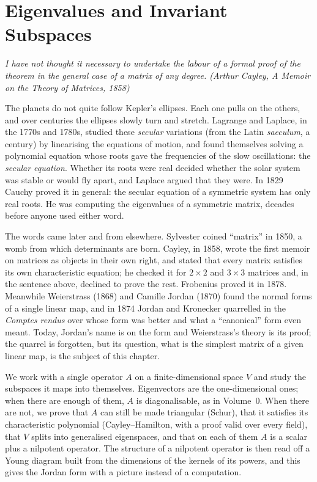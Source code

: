 \chapter{Eigenvalues and Invariant Subspaces}\label{linear:ch:eigen}

\begin{center}\itshape
I have not thought it necessary to undertake the labour of a formal proof of the theorem in the general case of a
matrix of any degree.
\upshape(Arthur Cayley, \emph{A Memoir on the Theory of Matrices}, 1858)
\end{center}

The planets do not quite follow Kepler's ellipses. Each one pulls on the others, and over centuries the ellipses
slowly turn and stretch. Lagrange and Laplace, in the 1770s and 1780s, studied these \emph{secular} variations (from
the Latin \emph{saeculum}, a century) by linearising the equations of motion, and found themselves solving a polynomial
equation whose roots gave the frequencies of the slow oscillations: the \emph{secular equation}. Whether its roots
were real decided whether the solar system was stable or would fly apart, and Laplace argued that they were. In 1829
Cauchy proved it in general: the secular equation of a symmetric system has only real roots. He was computing the
eigenvalues of a symmetric matrix, decades before anyone used either word.

The words came later and from elsewhere. Sylvester coined ``matrix'' in 1850, a womb from which determinants are born.
Cayley, in 1858, wrote the first memoir on matrices as objects in their own right, and stated that every matrix
satisfies its own characteristic equation; he checked it for $2\times2$ and $3\times3$ matrices and, in the sentence
above, declined to prove the rest. Frobenius proved it in 1878. Meanwhile Weierstrass (1868) and Camille Jordan (1870)
found the normal forms of a single linear map, and in 1874 Jordan and Kronecker quarrelled in the \emph{Comptes rendus}
over whose form was better and what a ``canonical'' form even meant. Today, Jordan's name is on the form and
Weierstrass's theory is its proof; the quarrel is forgotten, but its question, what is the simplest matrix of a given
linear map, is the subject of this chapter.

We work with a single operator $A$ on a finite-dimensional space $V$ and study the subspaces it maps into themselves.
Eigenvectors are the one-dimensional ones; when there are enough of them, $A$ is diagonalisable, as in Volume~0. When
there are not, we prove that $A$ can still be made triangular (Schur), that it satisfies its characteristic polynomial
(Cayley--Hamilton, with a proof valid over every field), that $V$ splits into generalised eigenspaces, and that on each of
them $A$ is a scalar plus a nilpotent operator. The structure of a nilpotent operator is then read off a Young diagram
built from the dimensions of the kernels of its powers, and this gives the Jordan form with a picture instead of a
computation.

